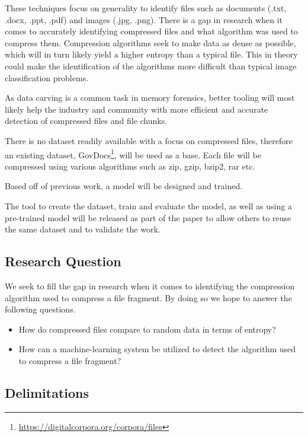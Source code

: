 \documentclass[conference]{IEEEtran}
\begin{document}
These techniques focus on generality to identify files such as documents (.txt, .docx, .ppt, .pdf) and images (.jpg, .png). There is a gap in research when it comes to accurately identifying compressed files and what algorithm was used to compress them. Compression algorithms seek to make data as dense as possible, which will in turn likely yield a higher entropy than a typical file. This in theory could make the identification of the algorithms more difficult than typical image classification problems\cite{PENROSE2013}.

As data carving is a common task in memory forensics, better tooling will most likely help the industry and community with more efficient and accurate detection of compressed files and file chunks.

There is no dataset readily available with a focus on compressed files, therefore an existing dataset, GovDocs\footnote{\href{https://digitalcorpora.org/corpora/files}{https://digitalcorpora.org/corpora/files}}, will be used as a base. Each file will be compressed using various algorithms such as zip, gzip, bzip2, rar etc.

Based off of previous work, a model will be designed and trained.

The tool to create the dataset, train and evaluate the model, as well as using a pre-trained model will be released as part of the paper to allow others to reuse the same dataset and to validate the work.

\subsection{Research Question}

We seek to fill the gap in research when it comes to identifying the compression algorithm used to compress a file fragment. By doing so we hope to answer the following questions.

\begin{itemize}
    \item How do compressed files compare to random data in terms of entropy?
    \item How can a machine-learning system be utilized to detect the algorithm used to compress a file fragment?
\end{itemize}

\subsection{Delimitations}
\end{document}

